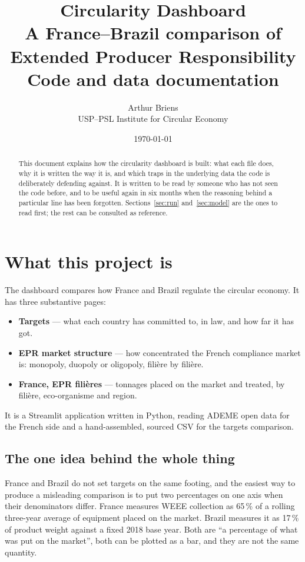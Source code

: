 \documentclass[11pt,a4paper]{article}
\title{Circularity Dashboard\\
\large A France--Brazil comparison of Extended Producer Responsibility\\[4pt]
\normalsize Code and data documentation}
\author{Arthur Briens \\ \small USP--PSL Institute for Circular Economy}
\date{\today}
\begin{document}
\maketitle

\begin{abstract}
\noindent
This document explains how the circularity dashboard is built: what each file
does, why it is written the way it is, and which traps in the underlying data
the code is deliberately defending against. It is written to be read by someone
who has not seen the code before, and to be useful again in six months when the
reasoning behind a particular line has been forgotten. Sections~\ref{sec:run}
and~\ref{sec:model} are the ones to read first; the rest can be consulted as
reference.
\end{abstract}

\tableofcontents
\newpage

\section{What this project is}

The dashboard compares how France and Brazil regulate the circular economy. It
has three substantive pages:

\begin{itemize}
  \item \textbf{Targets} --- what each country has committed to, in law, and how
        far it has got.
  \item \textbf{EPR market structure} --- how concentrated the French compliance
        market is: monopoly, duopoly or oligopoly, filière by filière.
  \item \textbf{France, EPR filières} --- tonnages placed on the market and
        treated, by filière, eco-organisme and region.
\end{itemize}

It is a Streamlit application written in Python, reading ADEME open data for the
French side and a hand-assembled, sourced CSV for the targets comparison.

\subsection{The one idea behind the whole thing}

France and Brazil do not set targets on the same footing, and the easiest way to
produce a misleading comparison is to put two percentages on one axis when their
denominators differ. France measures WEEE collection as 65\,\% of a rolling
three-year average of equipment placed on the market. Brazil measures it as
17\,\% of product weight against a fixed 2018 base year. Both are ``a
percentage of what was put on the market'', both can be plotted as a bar, and
they are not the same quantity.
\end{document}
